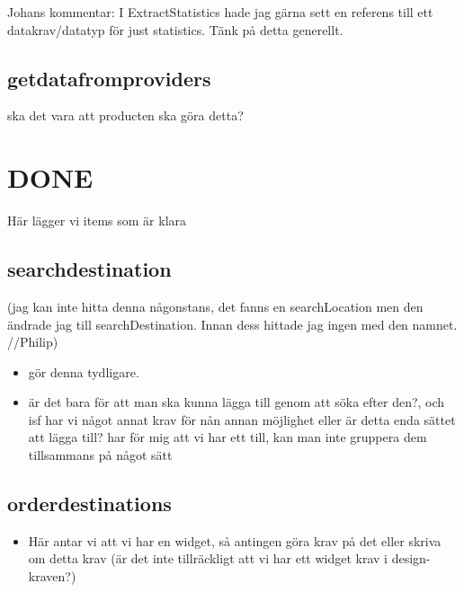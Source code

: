 \documentclass[a4paper]{article}
\begin{document}
	Johans kommentar: I ExtractStatistics hade jag gärna sett en referens till ett datakrav/datatyp för just statistics. Tänk på detta generellt.


	\subsection{getdatafromproviders}
	ska det vara att producten ska göra detta?
	



	
\section{DONE}
Här lägger vi items som är klara

	\subsection{searchdestination} (jag kan inte hitta denna någonstans, det fanns en searchLocation men den ändrade jag till searchDestination. Innan dess hittade jag ingen med den namnet. //Philip)
		\begin{itemize}
			\item gör denna tydligare. 
			\item är det bara för att man ska kunna lägga till genom att söka efter den?, och isf har vi något annat krav för nån annan möjlighet eller är detta enda sättet att lägga till? har för mig att vi har ett till, kan man inte gruppera dem tillsammans på något sätt
		\end{itemize}

\subsection{orderdestinations}
		\begin{itemize}
			\item Här antar vi att vi har en widget, så antingen göra krav på det eller skriva om detta krav (är det inte tillräckligt att vi har ett widget krav i design-kraven?)
		\end{itemize}
\end{document}
